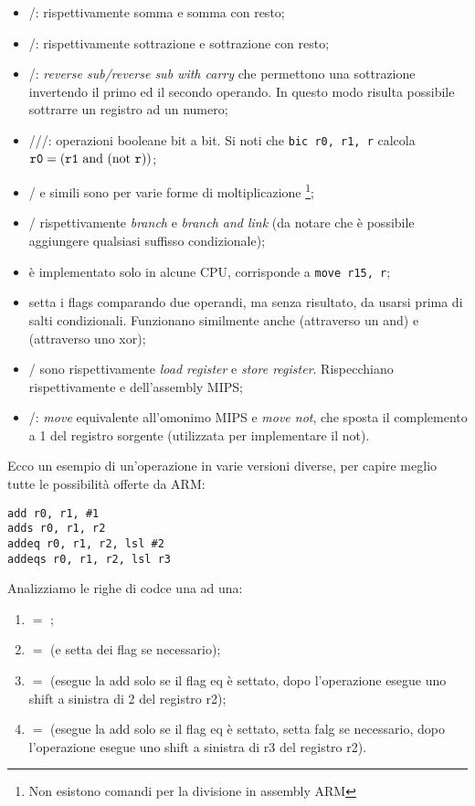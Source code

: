 \documentclass[class=book, crop=false, oneside]{standalone}
\begin{document}
\begin{itemize}
	\item {}/: rispettivamente somma e somma con resto;
	\item {}/: rispettivamente sottrazione e sottrazione con resto;
	\item {}/: \emph{reverse sub/reverse sub with carry} che permettono una sottrazione invertendo il primo ed il secondo operando. In questo modo risulta possibile sottrarre un registro ad un numero;
	\item {}///: operazioni booleane bit a bit. Si noti che \texttt{bic r0, r1, r} calcola \(\texttt{r0} = (\texttt{r1} \textrm{ and } (\textrm{not } \texttt{r}))\);
	\item {}/ e simili sono per varie forme di moltiplicazione \footnote{Non esistono comandi per la divisione in assembly ARM};
	\item {}/ rispettivamente \emph{branch} e \emph{branch and link} (da notare che è possibile aggiungere qualsiasi suffisso condizionale);
	\item {} è implementato solo in alcune CPU, corrisponde a \texttt{move r15, r};
	\item {} setta i flags comparando due operandi, ma senza risultato, da usarsi prima di salti condizionali. Funzionano similmente anche  (attraverso un and) e  (attraverso uno xor);
	\item {}/ sono rispettivamente \emph{load register} e \emph{store register}. Rispecchiano rispettivamente  e  dell'assembly MIPS;
	\item {}/: \emph{move} equivalente all'omonimo MIPS e \emph{move not}, che sposta il complemento a 1 del registro sorgente (utilizzata per implementare il not).
\end{itemize}
Ecco un esempio di un'operazione in varie versioni diverse, per capire meglio tutte le possibilità offerte da ARM:
\begin{verbatim}
add r0, r1, #1
adds r0, r1, r2
addeq r0, r1, r2, lsl #2
addeqs r0, r1, r2, lsl r3
\end{verbatim}
Analizziamo le righe di codce una ad una:
\begin{enumerate}
	\item {} \(=\) ;
	\item {} \(=\)  (e setta dei flag se necessario);
	\item {} \(=\)  (esegue la add solo se il flag eq è settato, dopo l'operazione esegue uno shift a sinistra di 2 del registro r2);
	\item {} \(=\)  (esegue la add solo se il flag eq è settato, setta falg se necessario, dopo l'operazione esegue uno shift a sinistra di r3 del registro r2).
\end{enumerate}
\end{document}
